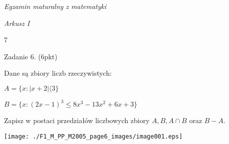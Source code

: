 \documentclass[a4paper,12pt]{article}
\begin{document}
{\it Egzamin maturalny z matematyki}

{\it Arkusz I}

7

Zadanie 6. (6pkt)

Dane są zbiory liczb rzeczywistych:

$A=\{x:|x+2|\langle 3\}$

$B=\{x:(2x-1)^{3}\leq 8x^{3}-13x^{2}+6x+3\}$

Zapisz w postaci przedziałów liczbowych zbiory $A, B, A\cap B$ oraz $B-A.$
\begin{center}
\texttt{[image: ./F1\_M\_PP\_M2005\_page6\_images/image001.eps]}
\end{center}
\end{document}
